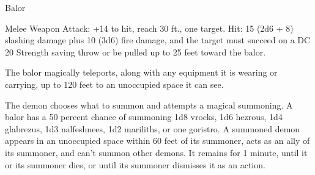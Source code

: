 \begin{monsterbox}{Balor}
\begin{monsteraction}[Longsword]
\end{monsteraction}
\begin{monsteraction}[Whip]
Melee Weapon Attack: +14 to hit, reach 30 ft., one target. Hit: 15 (2d6 + 8) slashing damage plus 10 (3d6) fire damage, and the target must succeed on a DC 20 Strength saving throw or be pulled up to 25 feet toward the balor.
\end{monsteraction}
\begin{monsteraction}[Teleport]
The balor magically teleports, along with any equipment it is wearing or carrying, up to 120 feet to an unoccupied space it can see.
\end{monsteraction}
\begin{monsteraction}
The demon chooses what to summon and attempts a magical summoning.
A balor has a 50 percent chance of summoning 1d8 vrocks, 1d6 hezrous, 1d4 glabrezus, 1d3 nalfeshnees, 1d2 mariliths, or one goristro.
A summoned demon appears in an unoccupied space within 60 feet of its summoner, acts as an ally of its summoner, and can't summon other demons. It remains for 1 minute, until it or its summoner dies, or until its summoner dismisses it as an action.
\end{monsteraction}
\end{monsterbox}
